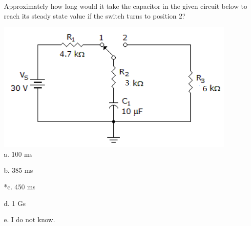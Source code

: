 
Approximately how long would it take the capacitor in the given circuit below to reach its steady state value if the switch turns to position 2?

\includegraphics[width=4.6875in,height=2.55208in]{../../Images/BasicElectronicComponentsQ7.png}\\

a. 100 ms

b. 385 ms

*c. 450 ms

d. 1 Gs

e. I do not know.\\
